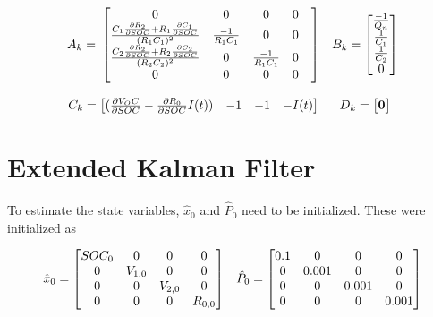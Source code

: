 \documentclass[12pt]{article}
\begin{document}
\begin{equation}
\centering
\begin{matrix}
A_k = \:
\begin{bmatrix}
0 & 0 & 0 & 0 \\
\frac{C_1\frac{\partial{R_2}}{\partial{SOC}} + R_1\frac{\partial{C_1}}{\partial{SOC}}}{(R_1C_1)^2} & \frac{-1}{R_1C_1} & 0 & 0 \\
\frac{C_2\frac{\partial{R_2}}{\partial{SOC}} + R_2\frac{\partial{C_2}}{\partial{SOC}}}{(R_2C_2)^2} & 0 & \frac{-1}{R_1C_1} & 0 \\
0 & 0 & 0 & 0 & \\
\end{bmatrix}
& B_k = 
\begin{bmatrix}
\frac{-1}{Q_n} \\
\frac{1}{C_1} \\
\frac{1}{C_2} \\
0 \\
\end{bmatrix} \\ \\
C_k = 
\begin{bmatrix}
(\frac{\partial{V_OC}}{\partial{SOC}} - \frac{\partial{R_0}}{\partial{SOC}}I(t)) & -1 & -1 & -I(t) 
\end{bmatrix} &

D_k = 
\begin{bmatrix}
\bf{0}
\end{bmatrix}
\end{matrix}
\end{equation}

\section{Extended Kalman Filter}

\par
To estimate the state variables, $\hat{x}_0$ and $\hat{P}_0$ need to be initialized. These were initialized as 

\begin{equation}
\centering
\begin{matrix}
\hat{x}_0 = 
	\begin{bmatrix}
	SOC_0 & 0 & 0 & 0 \\
	0 & V_{1,0} & 0 & 0 \\
	0 & 0 & V_{2,0} & 0 \\
	0 & 0 & 0 & R_{0,0} \\
	\end{bmatrix} & 

\hat{P}_0 = 
	\begin{bmatrix}
	0.1 & 0 & 0 & 0 \\
	0 & 0.001 & 0 & 0 \\
	0 & 0 & 0.001 & 0 \\
	0 & 0 & 0 & 0.001 \\
	\end{bmatrix} 

\end{matrix}
\end{equation}
\end{document}
